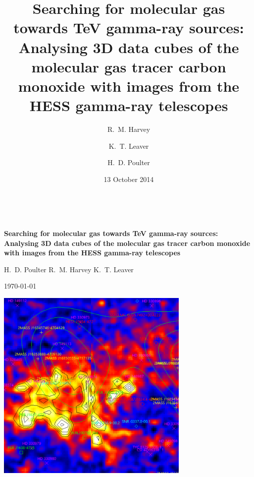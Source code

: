 \documentclass[a4paper, titlepage, oneside]{article}
\begin{document}
\title{\textbf{Searching for molecular gas towards TeV gamma-ray sources: Analysing 3D data cubes of the molecular gas tracer carbon monoxide with images from the HESS gamma-ray telescopes}}
\author{R.~M. Harvey \and K.~T. Leaver \and H.~D. Poulter}
\date{13 October 2014} %

\begin{titlepage}
  \begin{center}
  ~

  \vfill

  \begin{spacing}{1.9}
  {\LARGE \textbf{Searching for molecular gas towards TeV gamma-ray sources: Analysing 3D data cubes of the molecular gas tracer carbon monoxide with images from the HESS gamma-ray telescopes}}

  \vspace{2.5em}

  {\large H.~D. Poulter \quad\quad\quad R.~M. Harvey \quad\quad\quad K.~T. Leaver}
  \end{spacing}

  \vspace{1em}

  {\large \today}

  \vspace{2.5em}

  \includegraphics[width = 0.7\textwidth]{figures/cover-pic}

  \vfill

  ~

  \end{center}
\end{titlepage}
\end{document}
